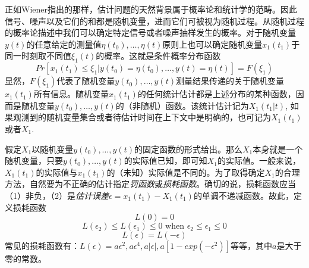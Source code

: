 \documentclass[UTF8,adobefonts]{ctexart}
\begin{document}
正如Wiener指出\cite{rf1}的那样，估计问题的天然背景属于概率论和统计学的范畴。因此信号、噪声以及它们的和都是随机变量，进而它们可被视为随机过程。从随机过程的概率论描述中我们可以确定特定信号或者噪声抽样发生的概率。对于随机变量$y(t)$的任意给定的测量值$\eta(t_0),\dotsc, \eta(t)$原则上也可以确定随机变量$x_1(t_1)$于同一时刻取不同值$\xi_1(t)$的概率。这就是条件概率分布函数
\begin{equation}
\label{eq1}
Pr[x_1(t_1) \le \xi_1 \vert y(t_0)=\eta(t_0),\dotsc, y(t)=\eta(t)]=F(\xi_1)
\end{equation}
显然，$F(\xi_1)$代表了随机变量$y(t_0), \dotsc, y(t)$测量结果传递的关于随机变量$x_1(t_1)$所有信息。随机变量$x_1(t_1)$的任何统计估计都是上述分布的某种函数，因而是随机变量$y(t_0), \dotsc, y(t)$的（非随机）函数。该统计估计记为$X_1(t_1 \vert t)$, 如果观测到的随机变量集合或者待估计时间在上下文中是明确的，也可记为$X_1(t_1)$或者$X_1$.

假定$X_1$以随机变量$y(t_0), \dotsc, y(t)$的固定函数的形式给出。那么$X_1$本身就是一个随机变量，只要$y(t_0), \dotsc, y(t)$的实际值已知，即可知$X_1$的实际值。一般来说，$X_1(t_1)$的实际值与$x_1(t_1)$的（未知）实际值是不同的。为了取得确定$X_1$的合理方法，自然要为不正确的估计指定\emph{罚函数}或\emph{损耗函数}。确切的说，损耗函数应当（1）非负，（2）是\emph{估计误差}$\epsilon=x_1(t_1)-X_1(t_1)$的单调不递减函数。故此，定义损耗函数
\begin{equation*}
L(0)=0
\end{equation*}
\begin{equation}
\label{eq2}
L(\epsilon_2) \le L(\epsilon_1) \le 0 \text{ when } \epsilon_2 \le \epsilon_1 \le 0
\end{equation}
\begin{equation*}
L(\epsilon)=L(-\epsilon) 
\end{equation*}
常见的损耗函数有：$L(\epsilon)=a \epsilon ^2,a \epsilon ^4,a \vert \epsilon \vert,a[1-exp(-\epsilon^2)]$等等，其中$a$是大于零的常数。
\end{document}
